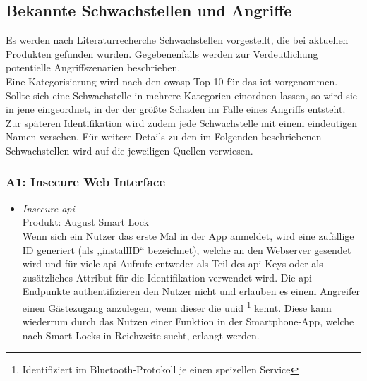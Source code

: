 \subsection{Bekannte Schwachstellen und Angriffe}
\label{sec:analysis_vulns}
    Es werden nach Literaturrecherche Schwachstellen vorgestellt, die bei aktuellen Produkten gefunden wurden.
    Gegebenenfalls werden zur Verdeutlichung potentielle Angriffszenarien beschrieben.
    \medskip\\
    Eine Kategorisierung wird nach den \gls{owasp}-Top 10 für das \gls{iot}\cite{Miessler2015} vorgenommen. 
    Sollte sich eine Schwachstelle in mehrere Kategorien einordnen lassen, so wird sie in jene eingeordnet, in der der größte Schaden im Falle eines Angriffs entsteht. 
    Zur späteren Identifikation wird zudem jede Schwachstelle mit einem eindeutigen Namen versehen.
    Für weitere Details zu den im Folgenden beschriebenen Schwachstellen wird auf die jeweiligen Quellen verwiesen.
    
    \subsubsection*{A1: Insecure Web Interface}
       \begin{itemize}[leftmargin=0cm,label={}]
            \item \emph{Insecure \gls{api}}\cite{Fuller2017,Lariviere2015}\label{vuln:userenum}\\
                Produkt: August Smart Lock\\
                Wenn sich ein Nutzer das erste Mal in der App anmeldet, wird eine zufällige ID generiert (als ,,installID`` bezeichnet), welche an den Webserver gesendet wird und für viele \gls{api}-Aufrufe entweder als Teil des \gls{api}-Keys oder als zusätzliches Attribut für die Identifikation verwendet wird. 
                Die \gls{api}-Endpunkte authentifizieren den Nutzer nicht und erlauben es einem Angreifer einen Gästezugang anzulegen, wenn dieser die \gls{uuid}
                \!\footnote{Identifiziert im Bluetooth-Protokoll je einen speizellen Service}
                kennt.
                Diese kann wiederrum durch das Nutzen einer Funktion in der Smartphone-App, welche nach Smart Locks in Reichweite sucht, erlangt werden. 
       \end{itemize} 
       
